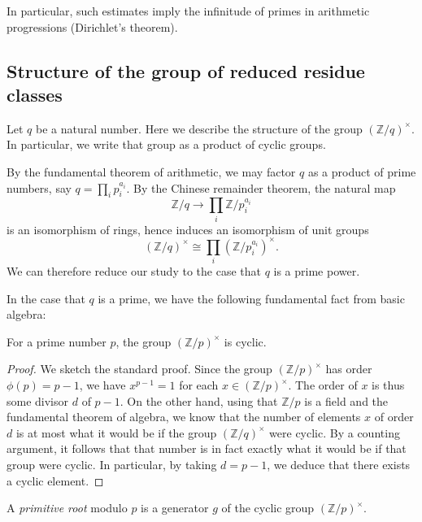 \documentclass[reqno]{amsart}  \numberwithin{theorem}{section} \numberwithin{equation}{section}
\begin{document}
In particular, such estimates imply the infinitude of primes in arithmetic progressions (Dirichlet's theorem).

\subsection{Structure of the group of reduced residue classes}\label{sec:cj56v04qkg}
Let $q$ be a natural number.  Here we describe the structure of the group $(\mathbb{Z} / q)^\times$.  In particular, we write that group as a product of cyclic groups.

By the fundamental theorem of arithmetic, we may factor $q$ as a product of prime numbers, say $q = \prod_i p_i^{a_i}$.  By the Chinese remainder theorem, the natural map
\begin{equation*}
  \mathbb{Z} / q \rightarrow \prod_i \mathbb{Z} / p_i^{a_i}
\end{equation*}
is an isomorphism of rings, hence induces an isomorphism of unit groups
\begin{equation}\label{eq:cj56v11l5g}
  (\mathbb{Z} / q) ^\times \cong \prod_i (\mathbb{Z} / p_i^{a_i })^\times.
\end{equation}
We can therefore reduce our study to the case that $q$ is a prime power.

In the case that $q$ is a prime, we have the following fundamental fact from basic algebra:
\begin{lemma}\label{lemma:cj57ckf53h}
  For a prime number $p$, the group $(\mathbb{Z} / p )^\times $ is cyclic.
\end{lemma}
\begin{proof}
  We sketch the standard proof.  Since the group $(\mathbb{Z} / p)^\times$ has order $\phi(p) = p-1$, we have $x^{p-1} = 1$ for each $x \in (\mathbb{Z} / p)^\times$.  The order of $x$ is thus some divisor $d$ of $p-1$.  On the other hand, using that $\mathbb{Z} / p$ is a field and the fundamental theorem of algebra, we know that the number of elements $x$ of order $d$ is at most what it would be if the group $(\mathbb{Z} / q)^\times$ were cyclic.  By a counting argument, it follows that that number is in fact exactly what it would be if that group were cyclic.  In particular, by taking $d = p-1$, we deduce that there exists a cyclic element.
\end{proof}
A \emph{primitive root} modulo $p$ is a generator $g$ of the cyclic group $(\mathbb{Z} /p )^\times $.
\end{document}
